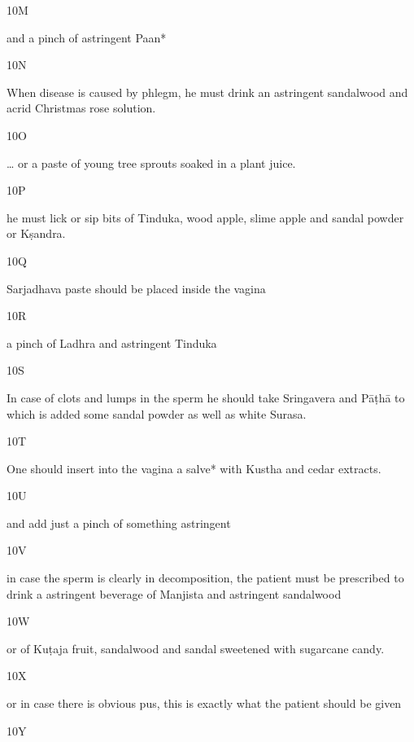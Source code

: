 \begin{translation}
\begin{tt}
\item[10M]

and a pinch of astringent Paan*
  
  
\item[10N]

When disease is caused by phlegm, he must drink an astringent 
  sandalwood and acrid Christmas rose solution.
  
\item[10O]

… or a paste of young tree sprouts soaked in a plant juice.
  
\item[10P]

he must lick or sip bits of Tinduka, wood apple, slime apple and sandal 
  powder or Kṣandra.
  
\item[10Q]

 Sarjadhava paste should be placed inside the vagina
  
\item[10R]

a pinch of Ladhra and astringent Tinduka
  
\item[10S]

In case of clots and lumps in the sperm he should take Sringavera and 
  Pāṭhā to which is added some sandal powder as well as white Surasa.
  
\item[10T]

One should insert into the vagina a salve* with Kustha and cedar 
  extracts.
  
\item[10U]

and add just a pinch of something astringent
  
\item[10V]

in case the sperm is clearly in decomposition, the patient must be 
  prescribed to drink a astringent beverage of Manjista and astringent sandalwood
  
\item[10W]

or of Kuṭaja fruit, sandalwood and sandal sweetened with sugarcane 
  candy.
  
\item[10X]

or in case there is obvious pus, this is exactly what the patient should 
  be given
  
\item[10Y]


\end{tt}
\end{translation}
